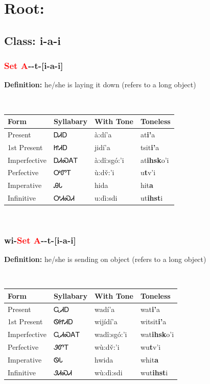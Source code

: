 \needspace{4in}
\section*{Root: }
\markboth{}{}
\nopagebreak
{}
\needspace{3in}
\subsection*{Class: i-a-i}
\nopagebreak
\needspace{2in}
\subsubsection*{\textcolor{Red}{Set A}{-}\textbf{}{-}t{-}[i-a-i]}
\nopagebreak
\textbf{Definition: } he/she is laying it down (refers to a long object)
\\[0.5em]
\begin{tabularx}{\textwidth}{l X X X}%
\toprule%
\textbf{Form}&\textbf{Syllabary}&\textbf{With Tone}&\textbf{Toneless}\\%
\midrule%
Present&ᎠᏗᎠ&à:dí’a&at\textbf{i'}a\\%
1st Present&ᏥᏗᎠ&jidí’a&tsit\textbf{i'}a\\%
Imperfective&ᎠᏗᏍᎪᎢ&à:dî:sgó:’i&at\textbf{ihsk}o'i\\%
Perfective&ᎤᏛᎢ&ù:dv̌:’i&u\textbf{t}v'i\\%
Imperative&ᎯᏓ&hida&hit\textbf{a}\\%
Infinitive&ᎤᏗᏍᏗ&u:dì:sdi&ut\textbf{ihst}i\\%
\bottomrule%
\end{tabularx}
\\[1em]
\needspace{2in}
\subsubsection*{wi{-}\textcolor{Red}{Set A}{-}\textbf{}{-}t{-}[i-a-i]}
\nopagebreak
\textbf{Definition: } he/she is sending on object (refers to a long object)
\\[0.5em]
\begin{tabularx}{\textwidth}{l X X X}%
\toprule%
\textbf{Form}&\textbf{Syllabary}&\textbf{With Tone}&\textbf{Toneless}\\%
\midrule%
Present&ᏩᏗᎠ&wadí’a&wat\textbf{i'}a\\%
1st Present&ᏫᏥᏗᎠ&wijídí’a&witsit\textbf{i'}a\\%
Imperfective&ᏩᏗᏍᎪᎢ&wadî:sgó:’i&wat\textbf{ihsk}o'i\\%
Perfective&ᏭᏛᎢ&wù:dv̌:’i&wu\textbf{t}v'i\\%
Imperative&ᏫᏓ&hwida&whit\textbf{a}\\%
Infinitive&ᏭᏗᏍᏗ&wù:dì:sdi&wut\textbf{ihst}i\\%
\bottomrule%
\end{tabularx}
\\[1em]